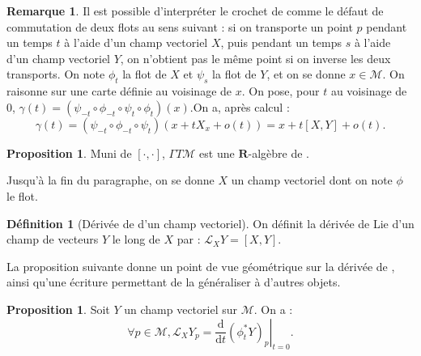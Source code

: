 \documentclass[12pt,a4paper]{article}
\theoremstyle{definition}
\newtheorem{prop}[thm]{Proposition}
\newtheorem{defn}[thm]{Définition}
\newtheorem{rqe}[thm]{Remarque}
\begin{document}
\begin{rqe}
Il est possible d'interpréter le crochet de  comme le défaut de commutation de deux flots au sens suivant : si on transporte un point $p$ pendant un temps $t$ à l'aide d'un champ vectoriel $X$, puis pendant un temps $s$ à l'aide d'un champ vectoriel $Y$, on n'obtient pas le même point si on inverse les deux transports. On note $\phi_t$ la flot de $X$ et $\psi_s$ la flot de $Y$, et on se donne $x\in\mathcal{M}$. On raisonne sur une carte définie au voisinage de $x$. On pose, pour $t$ au voisinage de $0$, $\gamma(t)=(\psi_{-t}\circ\phi_{-t}\circ\psi_t\circ\phi_t)(x)$.\newline On a, après calcul :
$$
\gamma(t)=(\psi_{-t}\circ\phi_{-t}\circ\psi_t)(x+tX_{x}+o(t))=x+t[X,Y]+o(t).
$$
\end{rqe}
\begin{prop}
Muni de $[\cdot,\cdot]$, $\Gamma T\mathcal{M}$ est une $\mathbf{R}$-algèbre de .
\end{prop}
\newpage
Jusqu'à la fin du paragraphe, on se donne $X$ un champ vectoriel dont on note $\phi$ le flot.
\begin{defn}[Dérivée de  d'un champ vectoriel]
On définit la dérivée de Lie d'un champ de vecteurs $Y$ le long de $X$ par : $\mathcal{L}_XY=[X,Y]$.
\end{defn}
La proposition suivante donne un point de vue géométrique sur la dérivée de , ainsi qu'une écriture permettant de la généraliser à d'autres objets.
\begin{prop}
Soit $Y$ un champ vectoriel sur $\mathcal{M}$. On a :
$$
\forall p\in\mathcal{M},\mathcal{L}_XY_p=\left.\dfrac{\mathrm{d}}{\mathrm{d}t}\left(\phi_t^*Y\right)_p\right|_{t=0}.
$$
\end{prop}
\end{document}
